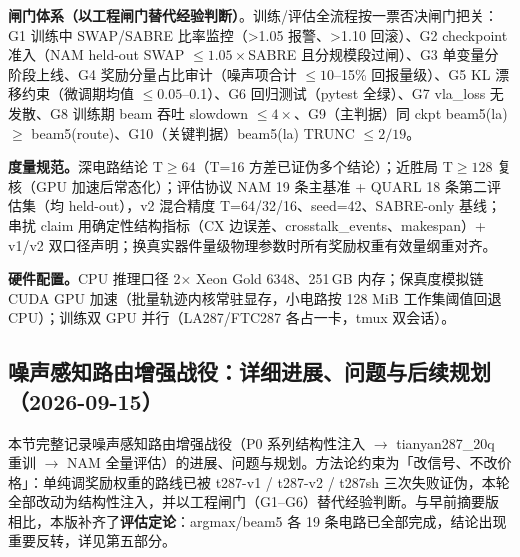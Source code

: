 \textbf{闸门体系（以工程闸门替代经验判断）}。训练/评估全流程按一票否决闸门把关：G1 训练中 SWAP/SABRE 比率监控（>1.05 报警、>1.10 回滚）、G2 checkpoint 准入（NAM held-out SWAP $\le1.05\times$SABRE 且分规模段过闸）、G3 单变量分阶段上线、G4 奖励分量占比审计（噪声项合计 $\le10$--15\% 回报量级）、G5 KL 漂移约束（微调期均值 $\le0.05$--0.1）、G6 回归测试（pytest 全绿）、G7 vla\_loss 无发散、G8 训练期 beam 吞吐 slowdown $\le4\times$、G9（主判据）同 ckpt beam5(la) $\ge$ beam5(route)、G10（关键判据）beam5(la) TRUNC $\le2/19$。

\textbf{度量规范。}深电路结论 T$\ge64$（T=16 方差已证伪多个结论）；近胜局 T$\ge128$ 复核（GPU 加速后常态化）；评估协议 NAM 19 条主基准 + QUARL 18 条第二评估集（均 held-out），v2 混合精度 T=64/32/16、seed=42、SABRE-only 基线；串扰 claim 用确定性结构指标（CX 边误差、crosstalk\_events、makespan）+ v1/v2 双口径声明；换真实器件量级物理参数时所有奖励权重有效量纲重对齐。

\textbf{硬件配置。}CPU 推理口径 2$\times$ Xeon Gold 6348、251\,GB 内存；保真度模拟链 CUDA GPU 加速（批量轨迹内核常驻显存，小电路按 128 MiB 工作集阈值回退 CPU）；训练双 GPU 并行（LA287/FTC287 各占一卡，tmux 双会话）。

\subsection{噪声感知路由增强战役：详细进展、问题与后续规划（2026-09-15）}

本节完整记录噪声感知路由增强战役（P0 系列结构性注入 $\to$ tianyan287\_20q 重训 $\to$ NAM 全量评估）的进展、问题与规划。方法论约束为「改信号、不改价格」：单纯调奖励权重的路线已被 t287-v1 / t287-v2 / t287sh 三次失败证伪，本轮全部改动为结构性注入，并以工程闸门（G1--G6）替代经验判断。与早前摘要版相比，本版补齐了\textbf{评估定论}：argmax/beam5 各 19 条电路已全部完成，结论出现重要反转，详见第五部分。

